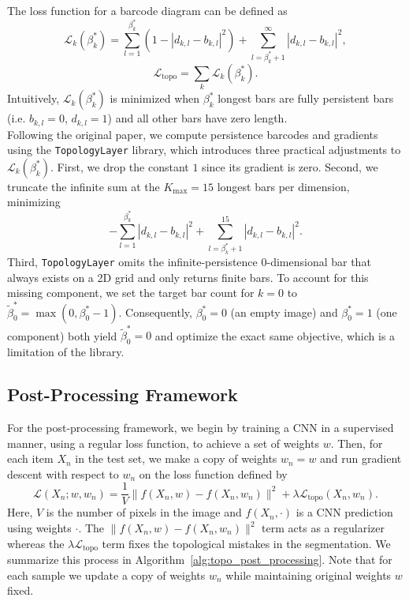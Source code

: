 The loss function for a barcode diagram can be defined as
\[
\mathcal{L}_k(\beta^*_k) = \sum_{l=1}^{\beta^*_k}(1 - |d_{k,l} - b_{k,l}|^2) + \sum_{l=\beta^*_k + 1}^{\infty}|d_{k,l} - b_{k,l}|^2,
\]
\[
\mathcal{L}_\text{topo} = \sum_{k} \mathcal{L}_k(\beta^*_k).
\]
Intuitively, $\mathcal{L}_k(\beta^*_k)$ is minimized when $\beta^*_k$ longest bars are fully persistent bars (i.e. $b_{k,l}=0$, $d_{k,l}=1$) and all other bars have zero length. \\

Following the original paper, we compute persistence barcodes and gradients using the \texttt{TopologyLayer} library\supercite{Gabrielsson:2020}, which introduces three practical adjustments to $\mathcal{L}_k(\beta_k^*)$. First, we drop the constant $1$ since its gradient is zero. Second, we truncate the infinite sum at the $K_{\max} = 15$ longest bars per dimension, minimizing
\[
-\sum_{l=1}^{\beta_k^*} |d_{k,l} - b_{k,l}|^2 + \sum_{l=\beta_k^*+1}^{15} |d_{k,l} - b_{k,l}|^2.
\]
Third, \texttt{TopologyLayer} omits the infinite-persistence $0$-dimensional bar that always exists on a 2D grid and only returns finite bars. To account for this missing component, we set the target bar count for $k=0$ to $\tilde{\beta}_0^* = \max(0, \beta_0^* - 1)$. Consequently, $\beta_0^* = 0$ (an empty image) and $\beta_0^* = 1$ (one component) both yield $\tilde{\beta}_0^* = 0$ and optimize the exact same objective, which is a limitation of the library.


\subsection{Post-Processing Framework}

For the post-processing framework, we begin by training a CNN in a supervised manner, using a regular loss function, to achieve a set of weights $w$. Then, for each item $X_n$ in the test set, we make a copy of weights $w_n=w$ and run gradient descent with respect to $w_n$ on the loss function defined by
\[
\mathcal{L}(X_n; w, w_n) = \frac{1}{V}\|f(X_n,w) - f(X_n,w_n)\|^2 + \lambda \mathcal{L}_\text{topo}(X_n, w_n).
\]
Here, $V$ is the number of pixels in the image and $f(X_n, \cdot)$ is a CNN prediction using weights $\cdot$. The $\|f(X_n,w) - f(X_n,w_n)\|^2$ term acts as a regularizer whereas the $\lambda \mathcal{L}_\text{topo}$ term fixes the topological mistakes in the segmentation. We summarize this process in Algorithm~\ref{alg:topo_post_processing}. Note that for each sample we update a copy of weights $w_n$ while maintaining original weights $w$ fixed.  \\

